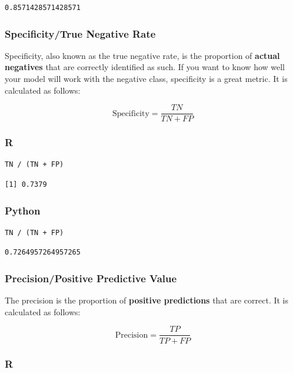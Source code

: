 \documentclass[
  letterpaper,
]{krantz}
\begin{document}
\begin{verbatim}
0.8571428571428571
\end{verbatim}

\subsubsection{Specificity/True Negative
Rate}\label{sec-knowing-metrics-specificity}

Specificity, also known as the true negative rate, is the proportion of
\textbf{actual negatives} that are correctly identified as such. If you
want to know how well your model will work with the negative class,
specificity is a great metric. It is calculated as follows:

\[\text{Specificity} = \frac{TN}{TN + FP}\]

\subsubsection{R}

\begin{verbatim}
TN / (TN + FP)
\end{verbatim}

\begin{verbatim}
[1] 0.7379
\end{verbatim}

\subsubsection{Python}

\begin{verbatim}
TN / (TN + FP)
\end{verbatim}

\begin{verbatim}
0.7264957264957265
\end{verbatim}

\subsubsection{Precision/Positive Predictive
Value}\label{sec-knowing-metrics-precision}

The precision is the proportion of \textbf{positive predictions} that
are correct. It is calculated as follows:

\[\text{Precision} = \frac{TP}{TP + FP}\]

\subsubsection{R}
\end{document}
